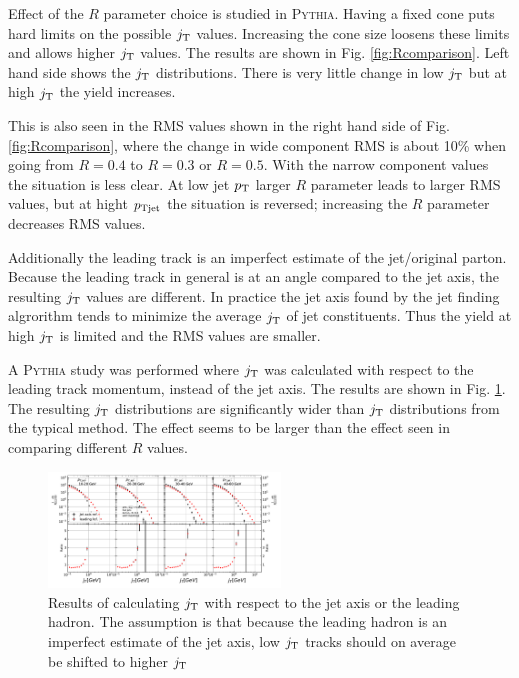 Effect of the $R$ parameter choice is studied in \textsc{Pythia}. Having a fixed cone puts hard limits on the possible $j_{\rm T}$ values. Increasing the cone size loosens these limits and allows higher $j_{\rm T}$ values. The results are shown in Fig. \ref{fig:Rcomparison}. Left hand side shows the $j_{\rm T}$ distributions. There is very little change in low $j_{\rm T}$ but at high $j_{\rm T}$ the yield increases.

This is also seen in the RMS values shown in the right hand side of Fig. \ref{fig:Rcomparison}, where the change in wide component RMS is about 10\% when going from $R=0.4$ to $R=0.3$ or $R=0.5$. With the narrow component values the situation is less clear. At low jet $p_{\rm T}$ larger $R$ parameter leads to larger RMS values, but at hight $p_{\rm Tjet}$ the situation is reversed; increasing the $R$ parameter decreases RMS values.

Additionally the leading track is an imperfect estimate of the jet/original parton. Because the leading track in general is at an angle compared to the jet axis, the resulting $j_{\rm T}$ values are different. In practice the jet axis found by the jet finding algrorithm tends to minimize the average $j_{\rm T}$ of jet constituents. Thus the yield at high $j_{\rm T}$ is limited and the RMS values are smaller.

A \textsc{Pythia} study was performed where $j_{\rm T}$ was calculated with respect to the leading track momentum, instead of the jet axis. The results are shown in Fig. \ref{fig:RefComparison}. The resulting $j_{\rm T}$ distributions are significantly wider than $j_{\rm T}$ distributions from the typical method. The effect seems to be larger than the effect seen in comparing different $R$ values.

\begin{figure}[htp]
\centering
\includegraphics[width=0.55\textwidth]{figures/results/JetVsLeadingRefConst.pdf}
\caption{Results of calculating $j_{\rm T}$ with respect to the jet axis or the leading hadron. The assumption is that because the leading hadron is an imperfect estimate of the jet axis, low $j_{\rm T}$ tracks should on average be shifted to higher $j_{\rm T}$}
\label{fig:RefComparison}

\end{figure}

